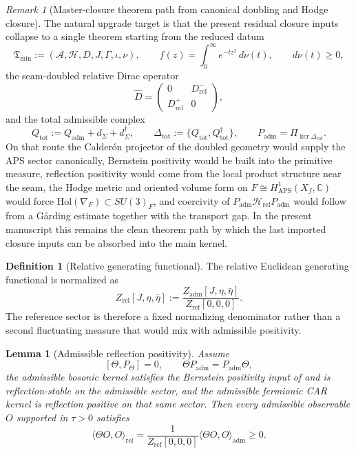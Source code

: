 \documentclass[11pt,a4paper]{article}
\newtheorem{lemma}[theorem]{Lemma}
\theoremstyle{definition}
\newtheorem{definition}[theorem]{Definition}
\theoremstyle{remark}
\newtheorem*{remark}{Remark}
\newcommand{\inv}{\iota}
\newcommand{\Hrel}{\mathcal H_{\mathrm{rel}}}
\newcommand{\Tmin}{\mathfrak T_{\mathrm{min}}}
\newcommand{\Padm}{P_{\mathrm{adm}}}
\begin{document}
\begin{remark}[Master-closure theorem path from canonical doubling and Hodge closure]
The natural upgrade target is that the present residual closure inputs collapse to a
single theorem starting from the reduced datum
\[
\Tmin:=(\mathcal A,\mathcal H,D,J,\Gamma,\inv,\nu),
\qquad
f(z)=\int_0^\infty e^{-t z^2}\,d\nu(t),
\qquad
d\nu(t)\ge 0,
\]
the seam-doubled relative Dirac operator
\[
\widehat D=
\begin{pmatrix}
0 & D^-_{\mathrm{rel}}\\
D^+_{\mathrm{rel}} & 0
\end{pmatrix},
\]
and the total admissible complex
\[
Q_{\mathrm{tot}}:=Q_{\mathrm{adm}}+d_\Sigma+d_\Sigma^\dagger,
\qquad
\Delta_{\mathrm{tot}}:=\{Q_{\mathrm{tot}},Q_{\mathrm{tot}}^\dagger\},
\qquad
\Padm=\Pi_{\ker\Delta_{\mathrm{tot}}}.
\]
On that route the Calder\'on projector of the doubled geometry would supply the APS
sector canonically, Bernstein positivity would be built into the primitive
measure, reflection positivity would come from the local product structure near
the seam, the Hodge metric and oriented volume form on
$F\cong H^1_{\mathrm{APS}}(X_f,\mathbb C)$ would force
$\mathrm{Hol}(\nabla_F)\subset SU(3)_F$, and coercivity of
$\Padm\Hrel\Padm$ would follow from a G{\aa}rding estimate together with the
transport gap. In the present manuscript this remains the clean theorem path by
which the last imported closure inputs can be absorbed into the main kernel.
\end{remark}

\begin{definition}[Relative generating functional]
\label{def:relative-generating-functional}
The relative Euclidean generating functional is normalized as
\[
Z_{\mathrm{rel}}[J,\eta,\bar\eta]
:=
\frac{Z_{\mathrm{adm}}[J,\eta,\bar\eta]}{Z_{\mathrm{ref}}[0,0,0]}.
\]
The reference sector is therefore a fixed normalizing denominator rather than a second fluctuating measure that would mix with admissible positivity.
\end{definition}

\begin{lemma}[Admissible reflection positivity]
\label{lem:admissible-reflection-positivity}
Assume
\[
[\Theta,P_\Theta]=0,
\qquad
\Theta\Padm=\Padm\Theta,
\]
the admissible bosonic kernel satisfies the Bernstein positivity input of  and is reflection-stable on the admissible sector, and the admissible fermionic CAR kernel is reflection positive on that same sector. Then every admissible observable $O$ supported in $\tau>0$ satisfies
\[
\langle \Theta O,O\rangle_{\mathrm{rel}}
=
\frac{1}{Z_{\mathrm{ref}}[0,0,0]}
\langle \Theta O,O\rangle_{\mathrm{adm}}
\ge 0.
\]
\end{lemma}
\end{document}
